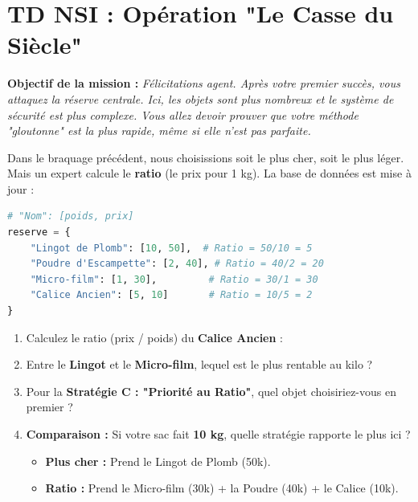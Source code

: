 \section*{TD NSI :  Opération "Le Casse du Siècle"}

\textbf{Objectif de la mission :} \textit{Félicitations agent. Après votre premier succès, vous attaquez la réserve centrale. Ici, les objets sont plus nombreux et le système de sécurité est plus complexe. Vous allez devoir prouver que votre méthode "gloutonne" est la plus rapide, même si elle n'est pas parfaite.}

\begin{Exercise}[title={Le sens des affaires : La stratégie du Ratio }]
Dans le braquage précédent, nous choisissions soit le plus cher, soit le plus léger. Mais un expert calcule le \textbf{ratio} (le prix pour 1 kg).
La base de données est mise à jour :
\begin{lstlisting}[style=pythonstyle, language=Python]
# "Nom": [poids, prix]
reserve = {
    "Lingot de Plomb": [10, 50],  # Ratio = 50/10 = 5
    "Poudre d'Escampette": [2, 40], # Ratio = 40/2 = 20
    "Micro-film": [1, 30],         # Ratio = 30/1 = 30
    "Calice Ancien": [5, 10]       # Ratio = 10/5 = 2
}
\end{lstlisting}

\begin{enumerate}
    \item  Calculez le ratio (prix / poids) du \textbf{Calice Ancien} : \dotfill
    \item  Entre le \textbf{Lingot} et le \textbf{Micro-film}, lequel est le plus rentable au kilo ? \dotfill
    \item  Pour la \textbf{Stratégie C : "Priorité au Ratio"}, quel objet choisiriez-vous en premier ? \dotfill
    \item \textbf{Comparaison :} Si votre sac fait \textbf{10 kg}, quelle stratégie rapporte le plus ici ?
    \begin{itemize}
        \item[$\square$] \textbf{Plus cher :} Prend le Lingot de Plomb (50k\texteuro).
        \item[$\square$] \textbf{Ratio :} Prend le Micro-film (30k\texteuro) + la Poudre (40k\texteuro) + le Calice (10k\texteuro).
    \end{itemize}
\end{enumerate}
\end{Exercise}

